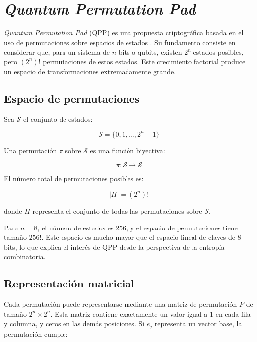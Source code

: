 \section{\textit{Quantum Permutation Pad}}
\label{sec:qpp}

\textit{Quantum Permutation Pad} (QPP) es una propuesta criptográfica basada en el uso de permutaciones sobre espacios de estados \cite{Kuang2022QuantumCryptography,Kuang2024QPPGroup}. Su fundamento consiste en considerar que, para un sistema de $n$ bits o qubits, existen $2^n$ estados posibles, pero $(2^n)!$ permutaciones de estos estados. Este crecimiento factorial produce un espacio de transformaciones extremadamente grande.

\subsection{Espacio de permutaciones}

Sea $\mathcal{S}$ el conjunto de estados:

\begin{equation}
    \mathcal{S} = \{0,1,\ldots,2^n-1\}
\end{equation}

Una permutación $\pi$ sobre $\mathcal{S}$ es una función biyectiva:

\begin{equation}
    \pi: \mathcal{S} \rightarrow \mathcal{S}
\end{equation}

El número total de permutaciones posibles es:

\begin{equation}
    |\Pi| = (2^n)!
\end{equation}

donde $\Pi$ representa el conjunto de todas las permutaciones sobre $\mathcal{S}$.

Para $n=8$, el número de estados es $256$, y el espacio de permutaciones tiene tamaño $256!$. Este espacio es mucho mayor que el espacio lineal de claves de $8$ bits, lo que explica el interés de QPP desde la perspectiva de la entropía combinatoria.

\subsection{Representación matricial}

Cada permutación puede representarse mediante una matriz de permutación $P$ de tamaño $2^n \times 2^n$. Esta matriz contiene exactamente un valor igual a $1$ en cada fila y columna, y ceros en las demás posiciones. Si $e_j$ representa un vector base, la permutación cumple:

